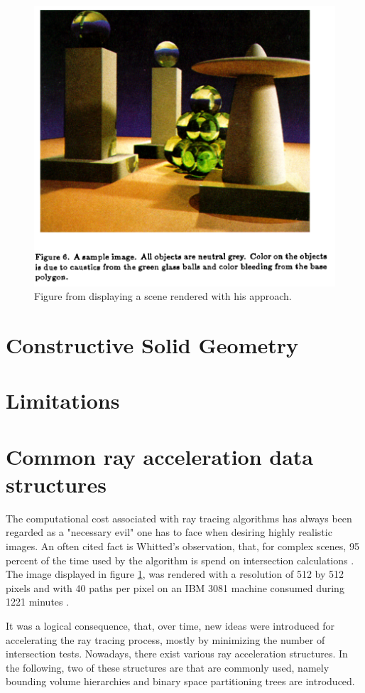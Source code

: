 \begin{figure}[h]
	\centering
	\includegraphics[width=.75\linewidth]{img/1 fundamentals/rendering_eq_figure.png}
	\caption{Figure from \cite{kajiya1986rendering} displaying a scene rendered with his approach.}
	\label{fig:rendering_eq}
\end{figure}


\section{Constructive Solid Geometry}


\section{Limitations}




\section{Common ray acceleration data structures}
The computational cost associated with ray tracing algorithms has always been regarded as a "necessary evil" one has to face when desiring highly realistic images. An often cited fact is Whitted's observation, that, for complex scenes, 95 percent of the time used by the algorithm is spend on intersection calculations \cite[p 349]{whitted1979improved}. The image displayed in figure \ref{fig:rendering_eq}, was rendered with a resolution of 512 by 512 pixels and with 40 paths per pixel on an IBM 3081 machine consumed during 1221 minutes \cite[p 149]{kajiya1986rendering}. 

It was a logical consequence, that, over time, new ideas were introduced for accelerating the ray tracing process, mostly by minimizing the number of intersection tests. Nowadays, there exist various ray acceleration structures. In the following, two of these structures are that are commonly used, namely bounding volume hierarchies and binary space partitioning trees are introduced.

